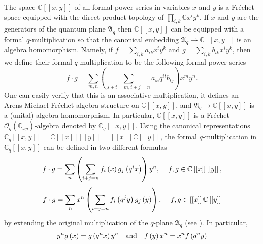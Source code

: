 \documentclass[12pt,reqno]{amsart}%
\theoremstyle{plain}
\numberwithin{theorem}{section} \numberwithin{equation}{section}
\numberwithin{lemma}{section}
\numberwithin{remark}{section}
\numberwithin{example}{section}
\numberwithin{proposition}{section}
\numberwithin{definition}{section}
\numberwithin{corollary}{section}
\begin{document}
The space $\mathbb{C}\left[  \left[  x,y\right]  \right]  $ of all formal
power series in variables $x$ and $y$ is a Fr\'{e}chet space equipped with the
direct product topology of $\prod\limits_{i,k}\mathbb{C}x^{i}y^{k}$. If $x$
and $y$ are the generators of the quantum plane $\mathfrak{A}_{q}$ then
$\mathbb{C}\left[  \left[  x,y\right]  \right]  $ can be equipped with a
formal $q$-multiplication so that the canonical embedding $\mathfrak{A}%
_{q}\rightarrow\mathbb{C}\left[  \left[  x,y\right]  \right]  $ is an algebra
homomorphism. Namely, if $f=\sum_{i,k}a_{ik}x^{i}y^{k}$ and $g=\sum
_{i,k}b_{ik}x^{i}y^{k}$, then we define their formal $q$-multiplication to be
the following formal power series%
\begin{equation}
f\cdot g=\sum_{m,n}\left(  \sum_{s+t=m,i+j=n}a_{si}q^{it}b_{tj}\right)
x^{m}y^{n}. \label{mulFr}%
\end{equation}
One can easily verify that this is an associative multiplication, it defines
an Arens-Michael-Fr\'{e}chet algebra structure on $\mathbb{C}\left[  \left[
x,y\right]  \right]  $, and $\mathfrak{A}_{q}\rightarrow\mathbb{C}\left[
\left[  x,y\right]  \right]  $ is a (unital) algebra homomorphism. In
particular, $\mathbb{C}\left[  \left[  x,y\right]  \right]  $ is a Fr\'{e}chet
$\mathcal{O}_{q}\left(  \mathbb{C}_{xy}\right)  $-algebra denoted by
$\mathbb{C}_{q}\left[  \left[  x,y\right]  \right]  $. Using the canonical
representations $\mathbb{C}_{q}\left[  \left[  x,y\right]  \right]
=\mathbb{C}\left[  \left[  x\right]  \right]  \left[  \left[  y\right]
\right]  =\left[  \left[  x\right]  \right]  \mathbb{C}\left[  \left[
y\right]  \right]  $, the formal $q$-multiplication in $\mathbb{C}_{q}\left[
\left[  x,y\right]  \right]  $ can be defined in two different formulas
\begin{equation}
f\cdot g=\sum_{n}\left(  \sum_{i+j=n}f_{i}\left(  x\right)  g_{j}\left(
q^{i}x\right)  \right)  y^{n}\text{,\quad\ }f,g\in\mathbb{C}\left[  \left[
x\right]  \right]  \left[  \left[  y\right]  \right]  \text{,} \label{5p2}%
\end{equation}%
\begin{equation}
f\cdot g=\sum_{n}x^{n}\left(  \sum_{i+j=n}f_{i}\left(  q^{j}y\right)
g_{j}\left(  y\right)  \right)  \text{, \quad}f,g\in\left[  \left[  x\right]
\right]  \mathbb{C}\left[  \left[  y\right]  \right]  \label{pp4}%
\end{equation}
by extending the original multiplication of the $q$-plane $\mathfrak{A}_{q}$
(see \cite{Dosi25}). In particular,
\[
y^{n}g\left(  x\right)  =g\left(  q^{n}x\right)  y^{n}\quad\text{and\quad
}f\left(  y\right)  x^{n}=x^{n}f\left(  q^{n}y\right)
\]
\end{document}
